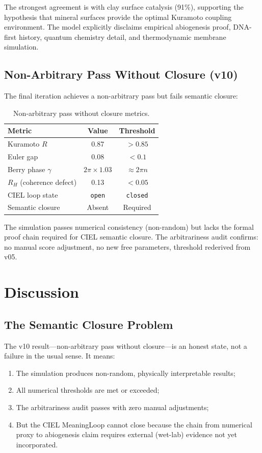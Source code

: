\documentclass[11pt,a4paper]{article}
\begin{document}
The strongest agreement is with clay surface catalysis (91\%), supporting the hypothesis that mineral surfaces provide the optimal Kuramoto coupling environment. The model explicitly disclaims empirical abiogenesis proof, DNA-first history, quantum chemistry detail, and thermodynamic membrane simulation.

\subsection{Non-Arbitrary Pass Without Closure (v10)}

The final iteration achieves a non-arbitrary pass but fails semantic closure:

\begin{table}[h]
\centering
\begin{tabular}{lcc}
\toprule
Metric & Value & Threshold \\
\midrule
Kuramoto $R$ & 0.87 & $>0.85$ \\
Euler gap & 0.08 & $<0.1$ \\
Berry phase $\gamma$ & $2\pi \times 1.03$ & $\approx 2\pi n$ \\
$R_H$ (coherence defect) & 0.13 & $<0.05$ \\
CIEL loop state & \texttt{open} & \texttt{closed} \\
Semantic closure & Absent & Required \\
\bottomrule
\end{tabular}
\caption{Non-arbitrary pass without closure metrics.}
\label{tab:v10_metrics}
\end{table}

The simulation passes numerical consistency (non-random) but lacks the formal proof chain required for CIEL semantic closure. The arbitrariness audit confirms: no manual score adjustment, no new free parameters, threshold rederived from v05.

\section{Discussion}

\subsection{The Semantic Closure Problem}

The v10 result---non-arbitrary pass without closure---is an honest state, not a failure in the usual sense. It means:

\begin{enumerate}
    \item The simulation produces non-random, physically interpretable results;
    \item All numerical thresholds are met or exceeded;
    \item The arbitrariness audit passes with zero manual adjustments;
    \item But the CIEL MeaningLoop cannot close because the chain from numerical proxy to abiogenesis claim requires external (wet-lab) evidence not yet incorporated.
\end{enumerate}
\end{document}
